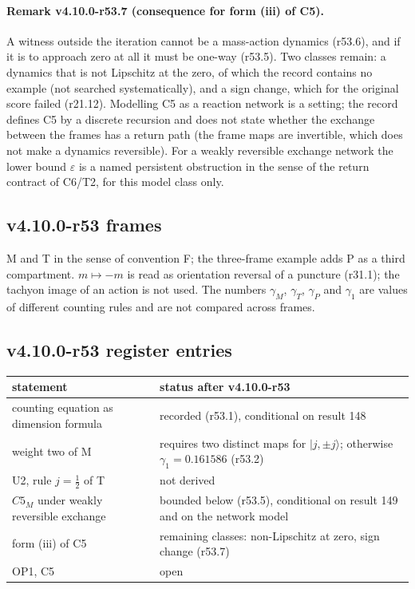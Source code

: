 \paragraph{Remark v4.10.0-r53.7 (consequence for form (iii) of C5).}
A witness outside the iteration cannot be a mass-action dynamics (r53.6), and if it is to approach zero at all it must be one-way (r53.5).  Two
classes remain: a dynamics that is not Lipschitz at the zero, of which the record contains no example (not searched systematically), and a sign change,
which for the original score failed (r21.12).  Modelling C5 as a reaction network is a setting; the record defines C5 by a discrete recursion and does
not state whether the exchange between the frames has a return path (the frame maps are invertible, which does not make a dynamics reversible).
For a weakly reversible exchange network the lower bound \(\varepsilon\) is a named persistent obstruction in the sense of the return contract of C6/T2,
for this model class only.

\subsection*{v4.10.0-r53 frames}
\label{subsec:v4100-r53-frames}

M and T in the sense of convention F; the three-frame example adds P as a third compartment.  \(m\mapsto-m\) is read as orientation reversal of a puncture
(r31.1); the tachyon image of an action is not used.  The numbers \(\gamma_M\), \(\gamma_T\), \(\gamma_P\) and \(\gamma_1\) are values of different counting rules and are
not compared across frames.

\subsection*{v4.10.0-r53 register entries}
\label{subsec:v4100-r53-register}

\begin{center}
\small
\begin{tabular}{@{}>{\raggedright\arraybackslash}p{}>{\raggedright\arraybackslash}p{}@{}}
\toprule
statement & status after v4.10.0-r53\\
\midrule
counting equation as dimension formula & recorded (r53.1), conditional on result 148\\
weight two of M & requires two distinct maps for \(|j,\pm j\rangle\); otherwise \(\gamma_1=0.161586\) (r53.2)\\
U2, rule \(j=\tfrac12\) of T & not derived\\
\(C5_M\) under weakly reversible exchange & bounded below (r53.5), conditional on result 149 and on the network model\\
form (iii) of C5 & remaining classes: non-Lipschitz at zero, sign change (r53.7)\\
OP1, C5 & open\\
\bottomrule
\end{tabular}
\end{center}

